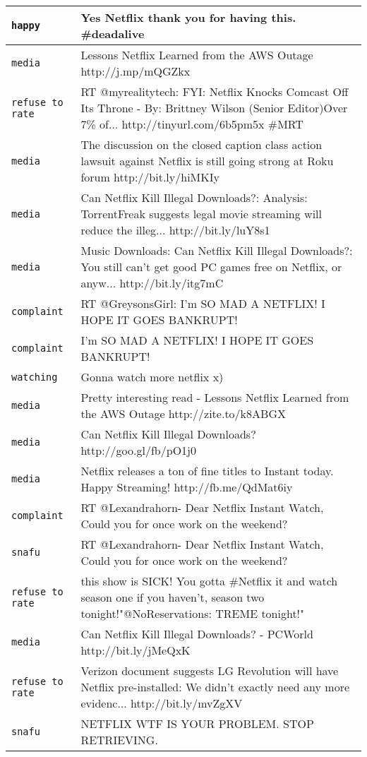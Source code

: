 \begin{center}
\begin{longtable}{|l|p{120mm}|}
      \tabularnewline\hline
         \texttt{happy} & Yes Netflix thank you for having this. \#deadalive
      \tabularnewline\hline
         \texttt{media} & Lessons Netflix Learned from the AWS Outage http://j.mp/mQGZkx
      \tabularnewline\hline
         \texttt{refuse to rate} & RT @myrealitytech: FYI: Netflix Knocks Comcast Off Its Throne - By: Brittney Wilson (Senior Editor)Over 7\% of... http://tinyurl.com/6b5pm5x \#MRT
      \tabularnewline\hline
         \texttt{media} & The discussion on the closed caption class action lawsuit against Netflix is still going strong at Roku forum http://bit.ly/hiMKIy
      \tabularnewline\hline
         \texttt{media} & Can Netflix Kill Illegal Downloads?: Analysis: TorrentFreak suggests legal movie streaming will reduce the illeg... http://bit.ly/luY8s1
      \tabularnewline\hline
         \texttt{media} & Music Downloads: Can Netflix Kill Illegal Downloads?: You still can't get good PC games free on Netflix, or anyw... http://bit.ly/itg7mC
      \tabularnewline\hline
         \texttt{complaint} & RT @GreysonsGirl: I'm SO MAD A NETFLIX! I HOPE IT GOES BANKRUPT!
      \tabularnewline\hline
         \texttt{complaint} & I'm SO MAD A NETFLIX! I HOPE IT GOES BANKRUPT!
      \tabularnewline\hline
         \texttt{watching} & Gonna watch more netflix x)
      \tabularnewline\hline
         \texttt{media} & Pretty interesting read - Lessons Netflix Learned from the AWS Outage http://zite.to/k8ABGX
      \tabularnewline\hline
         \texttt{media} & Can Netflix Kill Illegal Downloads? http://goo.gl/fb/pO1j0
      \tabularnewline\hline
         \texttt{media} & Netflix releases a ton of fine titles to Instant today. Happy Streaming! http://fb.me/QdMat6iy
      \tabularnewline\hline
         \texttt{complaint} & RT @Lexandrahorn- Dear Netflix Instant Watch, Could you for once work on the weekend?
      \tabularnewline\hline
         \texttt{snafu} & RT @Lexandrahorn- Dear Netflix Instant Watch, Could you for once work on the weekend?
      \tabularnewline\hline
         \texttt{refuse to rate} & this show is SICK! You gotta \#Netflix it and watch season one if you haven't, season two tonight!"@NoReservations: TREME tonight!"
      \tabularnewline\hline
         \texttt{media} & Can Netflix Kill Illegal Downloads? - PCWorld http://bit.ly/jMeQxK
      \tabularnewline\hline
         \texttt{refuse to rate} & Verizon document suggests LG Revolution will have Netflix pre-installed: We didn't exactly need any more evidenc... http://bit.ly/mvZgXV
      \tabularnewline\hline
         \texttt{snafu} & NETFLIX WTF IS YOUR PROBLEM. STOP RETRIEVING.

\end{longtable}
\end{center}
